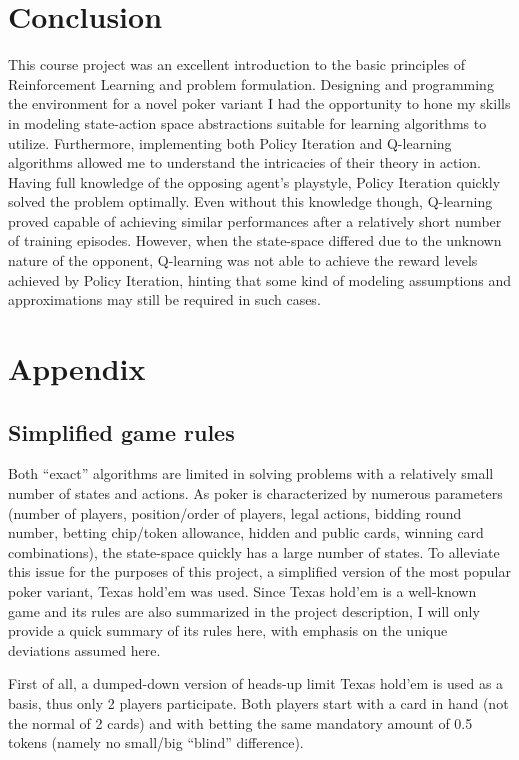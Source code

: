\section{Conclusion}

This course project was an excellent introduction to the basic principles of Reinforcement Learning and problem formulation. Designing and programming the environment for a novel poker variant I had the opportunity to hone my skills in modeling state-action space abstractions suitable for learning algorithms to utilize. Furthermore, implementing both Policy Iteration and Q-learning algorithms allowed me to understand the intricacies of their theory in action. Having full knowledge of the opposing agent's playstyle, Policy Iteration quickly solved the problem optimally. Even without this knowledge though, Q-learning proved capable of achieving similar performances after a relatively short number of training episodes. However, when the state-space differed due to the unknown nature of the opponent, Q-learning was not able to achieve the reward levels achieved by Policy Iteration, hinting that some kind of modeling assumptions and approximations may still be required in such cases.

\clearpage

\section*{Appendix}

\subsection*{Simplified game rules}

Both ``exact'' algorithms are limited in solving problems with a relatively small number of states and actions. As poker is characterized by numerous parameters (number of players, position/order of players, legal actions, bidding round number, betting chip/token allowance, hidden and public cards, winning card combinations), the state-space quickly has a large number of states. To alleviate this issue for the purposes of this project, a simplified version of the most popular poker variant, Texas hold'em was used. Since Texas hold'em is a well-known game and its rules are also summarized in the project description, I will only provide a quick summary of its rules here, with emphasis on the unique deviations assumed here.

First of all, a dumped-down version of heads-up limit Texas hold'em is used as a basis, thus only 2 players participate. Both players start with a card in hand (not the normal of 2 cards) and with betting the same mandatory amount of 0.5 tokens (namely no small/big ``blind'' difference). 

